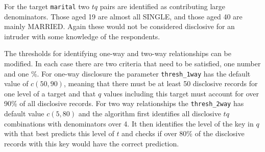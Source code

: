 \documentclass[12pt]{article}
\renewcommand{\baselinestretch}{1.5} %
\begin{document}
\renewcommand{\baselinestretch}{1.5}
For the target \texttt{marital} two $tq$ pairs are identified as contributing large denominators. Those aged 19 are almost all SINGLE, and those aged 40 are mainly MARRIED. Again these would not 
be considered disclosive for an intruder with some knowledge of the respondents.

The thresholds for identifying one-way and two-way relationships can be modified. In each case there are two criteria that need to be satisfied, one number and one \%. For one-way disclosure 
the parameter \texttt{thresh\_1way} has the default value of $c(50, 90)$, meaning that there must be at least 50 disclosive records for one level of a target and that $q$ values including this target must account for over 90\% of all disclosive records. For two way relationships the \texttt{thresh\_2way} has default value $c(5,80)$ and the algorithm first identifies all 
disclosive $tq$ combinations with denominators over 4. It then identifies the level of the key in $q$ with that best predicts this level of $t$ and checks if over 80\% of the disclosive records with this key would have the correct prediction. 
\end{document}
